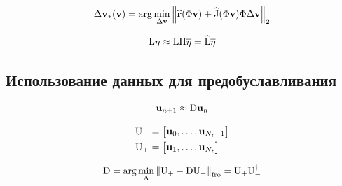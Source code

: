 \begin{align}
    \dvunk_\ast (\vunk)= \arg \min_{\dvunk} \norm[2]{\widehat{\resid}(\Phi \vunk) + \widehat{\jac}(\Phi \vunk) \Phi \dvunk}
\end{align}

\begin{align}
    \matr{\matr{L}} \nlin \approx
    \matr{\matr{L}} \matr{\Pi} \overline{\nlin} = \widehat{\matr{\matr{L}}} \overline{\nlin}
\end{align}

\begin{figure}[ht]
    \caption{ \cite{Elizarev2022}}\label{fig:ROM-II}
\end{figure}

\subsection{Использование данных для предобуславливания}

\begin{equation}
    \unk_{n+1} \approx \matr{D} \unk_{n}
\end{equation}

\begin{align}
    \matr{U}_{-} &=
    \begin{bmatrix}
        \unk_0, \dots, \unk_{N_t-1}
    \end{bmatrix}\\
    \matr{U}_{+} &=
    \begin{bmatrix}
        \unk_1, \dots, \unk_{N_t}
    \end{bmatrix}
\end{align}

\begin{align}
    \matr{D} = \arg \min_{\matr{A}} \norm[\text{fro}]{\matr{U}_{+} - \matr{D} \matr{U}_{-}} = \matr{U}_{+} \matr{U}_{-}^{\dagger}
\end{align}

